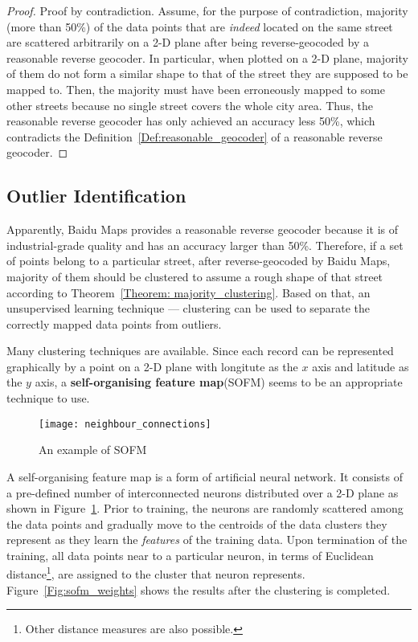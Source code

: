 \begin{proof}
Proof by contradiction. Assume, for the purpose of contradiction, majority (more than 50\%) of the data points that are \emph{indeed} located on the same street are scattered arbitrarily on a 2-D plane after being reverse-geocoded by a reasonable reverse geocoder. In particular, when plotted on a 2-D plane, majority of them do not form a similar shape to that of the street they are supposed to be mapped to. Then, the majority must have been erroneously mapped to some other streets because no single street covers the whole city area. Thus, the reasonable reverse geocoder has only achieved an accuracy less 50\%, which contradicts the Definition~\ref{Def:reasonable_geocoder} of a reasonable reverse geocoder. 
\end{proof}

\subsection{Outlier Identification}\label{SubSec:outlier_identify}
Apparently, Baidu Maps provides a reasonable reverse geocoder because it is of industrial-grade quality and has an accuracy larger than 50\%. Therefore, if a set of points belong to a particular street, after reverse-geocoded by Baidu Maps, majority of them should be clustered to assume a rough shape of that street according to Theorem~\ref{Theorem: majority_clustering}. Based on that, an unsupervised learning technique --- clustering can be used to separate the correctly mapped data points from outliers. 

Many clustering techniques are available\cite{LO05}. Since each record can be represented graphically by a point on a 2-D plane with longitute as the $x$ axis and latitude as the $y$ axis, a \textbf{self-organising feature map}\cite{TK82}(SOFM) seems to be an appropriate technique to use. 

\begin{figure}[h]
\texttt{[image: neighbour\_connections]}
\centering
\caption{An example of SOFM}\label{Fig:neighbour_connections}
\end{figure}

A self-organising feature map is a form of artificial neural network. It consists of a pre-defined number of interconnected neurons distributed over a 2-D plane as shown in Figure~\ref{Fig:neighbour_connections}. Prior to training, the neurons are randomly scattered among the data points and gradually move to the centroids of the data clusters they represent as they learn the \emph{features} of the training data. Upon termination of the training, all data points near to a particular neuron, in terms of Euclidean distance\footnote{Other distance measures are also possible.}, are assigned to the cluster that neuron represents. Figure~\ref{Fig:sofm_weights} shows the results after the clustering is completed. 

